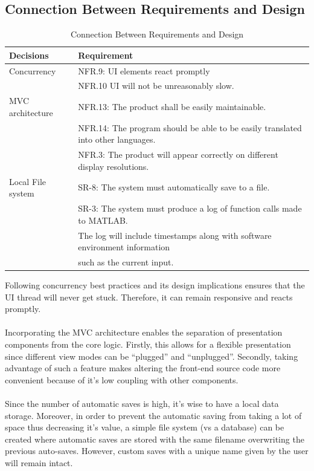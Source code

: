 \documentclass[12pt, titlepage]{article}
\begin{document}
\subsection{Connection Between Requirements and Design} 
\begin{table}[hp]
\centering
\caption{Connection Between Requirements and Design}
\label{TblRequirementsDesign}
\begin{tabular}{|p{}|p{}|}
\hline
Decisions & Requirement \\
\hline
Concurrency & NFR.9: UI elements react promptly\\ & NFR.10 UI will not be unreasonably slow.\\
\hline
MVC architecture & NFR.13: The product shall be easily maintainable.\\ & NFR.14: The program should be able to be easily translated into other languages. \\ & NFR.3: The product will appear correctly on different display resolutions.\\
\hline
Local File system & SR-8: The system must automatically save to a file.\\ & SR-3: The system must produce a log of function calls made to MATLAB.\\ & The log will include timestamps along with software environment information\\ & such as the current input.\\
\hline
\end{tabular}
\end{table}
Following concurrency best practices and its design implications ensures that the UI thread will never get stuck. Therefore, it can remain responsive and reacts promptly.\\\\
Incorporating the MVC architecture enables the separation of presentation components from the core logic. Firstly, this allows for a flexible presentation since different view modes can be “plugged” and “unplugged”. Secondly, taking advantage of such a feature makes altering the front-end source code more convenient because of it’s low coupling with other components.\\\\
Since the number of automatic saves is high, it’s wise to have a local data storage. Moreover, in order to prevent the automatic saving from taking a lot of space thus decreasing it’s value, a simple file system (vs a database) can be created where automatic saves are stored with the same filename overwriting the previous auto-saves. However, custom saves with a unique name given by the user will remain intact.  
\end{document}
